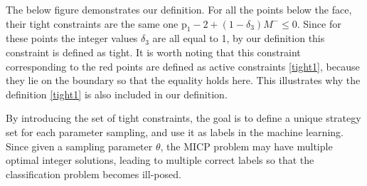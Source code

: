 \documentclass[a4paper]{report}
\begin{document}
The below figure demonstrates our definition. For all the points below the face, their tight constraints are the same one $\mathrm{p}_1-2 + \left(1-\delta_3\right)M^- \leq 0$. Since for these points the integer values $\delta_3$ are all equal to 1, by our definition this constraint is defined as tight. It is worth noting that this constraint corresponding to the red points are defined as active constraints \ref{tight1}, because they lie on the boundary so that the equality holds here. This illustrates why the definition \ref{tight1} is also included in our definition.

\begin{figure}[!htb]
    \centering
    \hspace{0.1cm}
    \label{tight_definition}
\end{figure}

By introducing the set of tight constraints, the goal is to define a unique strategy set for each parameter sampling, and use it as labels in the machine learning. Since given a sampling parameter $\theta$, the MICP problem may have multiple optimal integer solutions, leading to multiple correct labels so that the classification problem becomes ill-posed.
\end{document}
